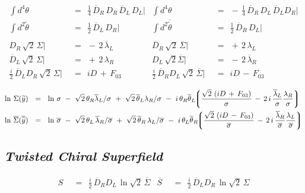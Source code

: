 \documentclass[14pt]{article}
\newcommand{\wt}{\widetilde}
\newcommand{\ov}{\overline}
\newcommand{\lgr}{\left\lgroup}
\newcommand{\rgr}{\right\rgroup}
\begin{document}
\begin{align*}
	\int d^4\theta & ~~=~~ \frac{1}{4}\, \ov D{}_R\, D_R\, \ov D{}_L\, D_L \Big|
	&
	\int d^4\theta & ~~=~~ -\, \frac{1}{4}\, \ov D{}_R\, D_L\, \ov D{}_L D_R \Big|
	\\
	\int d^2\wt\theta & ~~=~~ \frac{1}{2}\, \ov D{}_L\, D_R \Big|
	&
	\int d^2\ov{\wt\theta} & ~~=~~ \frac{1}{2}\, \ov D{}_R\, D_L \Big|
	\\ \\
	D_R\, \sqrt{2}\, \Sigma \Big| & ~~=~~ -\, 2\, \ov\lambda{}_L
	&
	\ov D{}_R\, \sqrt{2}\, \ov\Sigma \Big| & ~~=~~ +\, 2\, \lambda_L
	\\
	\ov D{}_L\, \sqrt{2}\, \Sigma \Big| & ~~=~~ +\, 2\, \lambda_R
	&
	D_L\, \sqrt{2} \ov\Sigma \Big| & ~~=~~ -\, 2\, \ov\lambda{}_R
	\\
	\frac{i}{2}\, \ov D{}_L D_R\, \sqrt{2}\, \Sigma \Big| & ~~=~~ iD \,+\, F_{03}
	&
	\frac{i}{2}\, \ov D{}_R D_L\, \sqrt{2}\, \ov\Sigma \Big| & ~~=~~ iD \,-\, F_{03}
\end{align*}

\begin{align*}
	\ln\, \Sigma(\wt y) & ~~=~~ \ln\,\sigma 
				~-~ \sqrt{2}\, \theta_R \ov\lambda{}_L / \sigma
				~+~ \sqrt{2}\, \ov\theta{}_L \lambda_R / \sigma
				~-~ i\, \theta_R \ov\theta{}_L \!\!
				    \lgr
					\frac{ \sqrt{2}\, \left( iD \,+\, F_{03} \right) }{ \sigma }
					\,-\,
					2\,i\, \frac{\ov\lambda{}_L}{\sigma} \frac{\lambda_R}{\sigma}
				    \rgr
	\\
	\ln\, \ov\Sigma(\ov{\wt y}) & ~~=~~ \ln\,\ov\sigma 
				~-~ \sqrt{2}\, \theta_L\, \ov\lambda{}_R / {\ov \sigma}
				~+~ \sqrt{2}\, \ov\theta{}_R\, \lambda_L / {\ov \sigma}
				~-~ i\, \theta_L \ov\theta{}_R \!\!
				    \lgr
					\frac{ \sqrt{2}\, \left( iD \,-\, F_{03} \right) }{ \ov\sigma }
					\,-\,
					2\,i\, \frac{\ov \lambda{}_R}{\ov\sigma} \frac{\lambda_L}{\ov\sigma}
				    \rgr
\end{align*}


\pagebreak
\subsection*{\centering \it Twisted Chiral Superfield }

\begin{align*}
%
	S &    ~~=~~    \frac{i}{2}\, \ov D{}_R D_L\, \ln \sqrt{2}\, \ov\Sigma
	&
	\ov S &    ~~=~~    \frac{i}{2}\, \ov D{}_L D_R\, \ln \sqrt{2}\, \Sigma
\end{align*}
\end{document}
